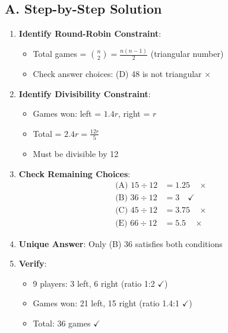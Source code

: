 \documentclass[12pt]{article}
\begin{document}
\begin{solutionbox}
\subsection*{A. Step-by-Step Solution}
\begin{enumerate}[leftmargin=*]
    \item \textbf{Identify Round-Robin Constraint}: 
    \begin{itemize}
        \item Total games = $\binom{n}{2} = \frac{n(n-1)}{2}$ (triangular number)
        \item Check answer choices: (D) 48 is not triangular $\times$
    \end{itemize}
    
    \item \textbf{Identify Divisibility Constraint}: 
    \begin{itemize}
        \item Games won: left = $1.4r$, right = $r$
        \item Total = $2.4r = \frac{12r}{5}$
        \item Must be divisible by 12
    \end{itemize}
    
    \item \textbf{Check Remaining Choices}: 
    \begin{align*}
    \text{(A) } 15 \div 12 &= 1.25 \quad \times\\
    \text{(B) } 36 \div 12 &= 3 \quad \checkmark\\
    \text{(C) } 45 \div 12 &= 3.75 \quad \times\\
    \text{(E) } 66 \div 12 &= 5.5 \quad \times
    \end{align*}
    
    \item \textbf{Unique Answer}: Only (B) 36 satisfies both conditions
    
    \item \textbf{Verify}: 
    \begin{itemize}
        \item 9 players: 3 left, 6 right (ratio 1:2 $\checkmark$)
        \item Games won: 21 left, 15 right (ratio 1.4:1 $\checkmark$)
        \item Total: 36 games $\checkmark$
    \end{itemize}
\end{enumerate}


\end{solutionbox}
\end{document}
